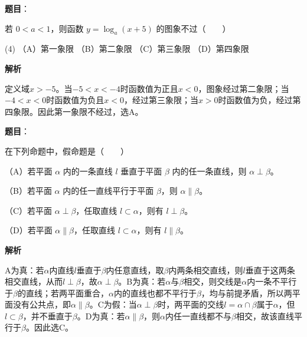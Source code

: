 \begin{answer}

\textbf{题目}：

若 $0<a<1$，则函数 $y=\log_a(x+5)$ 的图象不过\mbox{（　　）}

\begin{gkopts}(4)
\task （A）第一象限
\task （B）第二象限
\task （C）第三象限
\task （D）第四象限
\end{gkopts}

\textbf{解析}

定义域$x>-5$。当$-5<x<-4$时函数值为正且$x<0$，图象经过第二象限；当$-4<x<0$时函数值为负且$x<0$，经过第三象限；当$x>0$时函数值为负，经过第四象限。因此第一象限不经过，选A。


\end{answer}
\begin{answer}

\textbf{题目}：

在下列命题中，假命题是\mbox{（　　）}

（A）若平面 $\alpha$ 内的一条直线 $l$ 垂直于平面 $\beta$ 内的任一条直线，则 $\alpha\perp\beta$。

（B）若平面 $\alpha$ 内的任一直线平行于平面 $\beta$，则 $\alpha\parallel\beta$。

（C）若平面 $\alpha\perp\beta$，任取直线 $l\subset\alpha$，则有 $l\perp\beta$。

（D）若平面 $\alpha\parallel\beta$，任取直线 $l\subset\alpha$，则有 $l\parallel\beta$。

\textbf{解析}

A为真：若$\alpha$内直线$l$垂直于$\beta$内任意直线，取$\beta$内两条相交直线，则$l$垂直于这两条相交直线，从而$l\perp\beta$，故$\alpha\perp\beta$。B为真：若$\alpha$与$\beta$相交，则交线是$\alpha$内一条不平行于$\beta$的直线；若两平面重合，$\alpha$内的直线也都不平行于$\beta$，均与前提矛盾，所以两平面没有公共点，即$\alpha\parallel\beta$。C为假：当$\alpha\perp\beta$时，两平面的交线$l=\alpha\cap\beta$属于$\alpha$，但$l\subset\beta$，并不垂直于$\beta$。D为真：若$\alpha\parallel\beta$，则$\alpha$内任一直线都不与$\beta$相交，故该直线平行于$\beta$。因此选C。


\end{answer}
